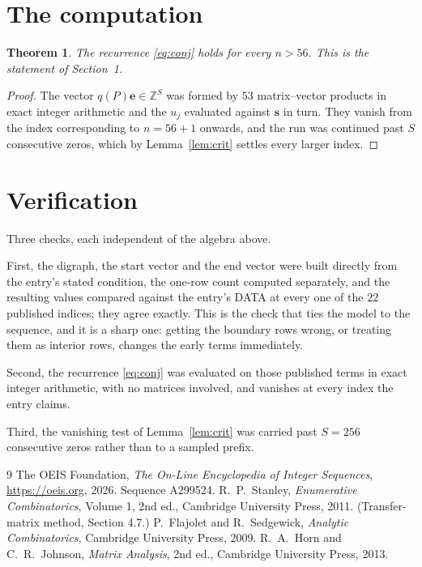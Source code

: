 \documentclass[11pt,a4paper]{article}
\theoremstyle{plain}
\newtheorem{theorem}{Theorem}
\theoremstyle{definition}
\begin{document}
\section{The computation}

\begin{theorem}
The recurrence \eqref{eq:conj} holds for every $n>56$. This is the statement of
Section~1.
\end{theorem}

\begin{proof}
The vector $q(P)\mathbf{e}\in\mathbb{Z}^{S}$ was formed by $53$ matrix--vector
products in exact integer arithmetic and the $u_j$ evaluated against $\mathbf{s}$ in turn.
They vanish from the index corresponding to $n=56+1$ onwards, and the run was continued
past $S$ consecutive zeros, which by Lemma~\ref{lem:crit} settles every larger index.
\end{proof}

\section{Verification}

Three checks, each independent of the algebra above.

First, the digraph, the start vector and the end vector were built directly from the
entry's stated condition, the one-row count computed separately, and the resulting values
compared against the entry's DATA at every one of the $22$ published indices; they
agree exactly. This is the check that ties the model to the sequence, and it is a sharp one:
getting the boundary rows wrong, or treating them as interior rows, changes the early terms
immediately.

Second, the recurrence \eqref{eq:conj} was evaluated on those published terms in exact
integer arithmetic, with no matrices involved, and vanishes at every index the entry claims.

Third, the vanishing test of Lemma~\ref{lem:crit} was carried past $S=256$ consecutive
zeros rather than to a sampled prefix.

\begin{thebibliography}{9}
 The OEIS Foundation, \emph{The On-Line Encyclopedia of Integer
Sequences}, \url{https://oeis.org}, 2026. Sequence A299524.
 R.~P.~Stanley, \emph{Enumerative Combinatorics}, Volume 1, 2nd ed.,
Cambridge University Press, 2011. (Transfer-matrix method, Section 4.7.)
 P.~Flajolet and R.~Sedgewick, \emph{Analytic Combinatorics}, Cambridge
University Press, 2009.
 R.~A.~Horn and C.~R.~Johnson, \emph{Matrix Analysis}, 2nd ed., Cambridge
University Press, 2013.
\end{thebibliography}
\end{document}
